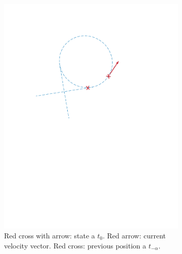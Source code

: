 \begin{itemize}
\begin{figure}[!htbp]
  \centering
   \begin{subfigure}[b]{0.45\textwidth}
        \includegraphics[width=\textwidth]{img/circular_movment1.pdf}
        \caption{Red cross with arrow: state a $t_0$. Red arrow: current velocity vector. Red cross: previous position a $t_{-\alpha}$.}
        \label{fig:one}
   \end{subfigure}\hfill
   \begin{subfigure}[b]{0.45\textwidth}

\end{subfigure}
\end{figure}
\end{itemize}
